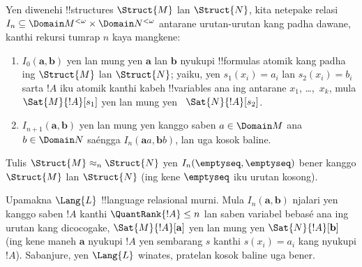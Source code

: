 \documentclass[../../../include/open-logic-section]{subfiles}
\begin{document}
\begin{defn}
  Yen diwenehi !!{structure}s
  $\Struct{M}$ lan $\Struct{N}$,
  kita netepake relasi
  $I_n \subseteq \Domain M^{<\omega}
  \times \Domain N^{<\omega}$
  antarane urutan-urutan kang padha
  dawane, kanthi rekursi tumrap $n$
  kaya mangkene:
   \begin{enumerate}
   \item $I_0(\mathbf{a},\mathbf{b})$
     yen lan mung yen $\mathbf{a}$
     lan $\mathbf{b}$ nyukupi
     !!{formula}s atomik kang padha
     ing $\Struct{M}$ lan
     $\Struct{N}$; yaiku, yen
     $s_1(x_i) = a_i$ lan
     $s_2(x_i) = b_i$
     sarta $!A$ iku atomik
     kanthi kabeh !!{variable}s
     ana ing antarane
     $x_1$, \dots,~$x_k$,
     mula $\Sat{M}{!A}[s_1]$
     yen lan mung yen~
     $\Sat{N}{!A}[s_2]$.
   \item $I_{n+1} (\mathbf{a},\mathbf{b})$
     yen lan mung yen kanggo
     saben $a\in \Domain M$
     ana $b\in \Domain N$
     saéngga $I_n
     (\mathbf{a}a,\mathbf{b}b)$,
     lan uga kosok baline.
   \end{enumerate}
\end{defn}

\begin{defn}
  Tulis $\Struct{M} \approx_n
  \Struct{N}$ yen
  $I_n(\emptyseq,\emptyseq)$
  bener kanggo $\Struct{M}$
  lan $\Struct{N}$
  (ing kene $\emptyseq$
  iku urutan kosong).
\end{defn}

\begin{thm}
  Upamakna $\Lang{L}$
  !!{language} relasional murni.
  Mula $I_n
  (\mathbf{a},\mathbf{b})$
  njalari yen kanggo saben $!A$
  kanthi $\QuantRank{!A} \le n$ lan saben variabel bebasé ana ing urutan kang dicocogake,
  $\Sat{M}{!A}[\mathbf{a}]$
  yen lan mung yen
  $\Sat{N}{!A}[\mathbf{b}]$
  (ing kene maneh $\mathbf{a}$
  nyukupi $!A$ yen sembarang
  $s$ kanthi
  $s(x_i) = a_i$
  kang nyukupi $!A$).
  Sabanjure, yen $\Lang{L}$
  winates, pratelan kosok
  baline uga bener.
\end{thm}
\end{document}

